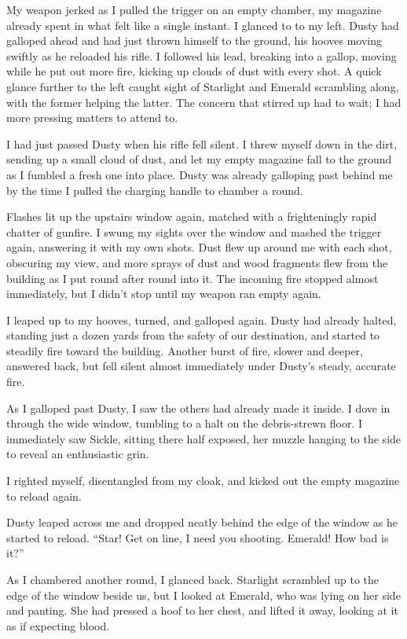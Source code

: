 My weapon jerked as I pulled the trigger on an empty chamber, my magazine already spent in what felt like a single instant. I glanced to to my left. Dusty had galloped ahead and had just thrown himself to the ground, his hooves moving swiftly as he reloaded his rifle. I followed his lead, breaking into a gallop, moving while he put out more fire, kicking up clouds of dust with every shot. A quick glance further to the left caught sight of Starlight and Emerald scrambling along, with the former helping the latter. The concern that stirred up had to wait; I had more pressing matters to attend to.

I had just passed Dusty when his rifle fell silent. I threw myself down in the dirt, sending up a small cloud of dust, and let my empty magazine fall to the ground as I fumbled a fresh one into place. Dusty was already galloping past behind me by the time I pulled the charging handle to chamber a round.

Flashes lit up the upstairs window again, matched with a frighteningly rapid chatter of gunfire. I swung my sights over the window and mashed the trigger again, answering it with my own shots. Dust flew up around me with each shot, obscuring my view, and more sprays of dust and wood fragments flew from the building as I put round after round into it. The incoming fire stopped almost immediately, but I didn’t stop until my weapon ran empty again.

I leaped up to my hooves, turned, and galloped again. Dusty had already halted, standing just a dozen yards from the safety of our destination, and started to steadily fire toward the building. Another burst of fire, slower and deeper, answered back, but fell silent almost immediately under Dusty’s steady, accurate fire.

As I galloped past Dusty, I saw the others had already made it inside. I dove in through the wide window, tumbling to a halt on the debris-strewn floor. I immediately saw Sickle, sitting there half exposed, her muzzle hanging to the side to reveal an enthusiastic grin.

I righted myself, disentangled from my cloak, and kicked out the empty magazine to reload again.

Dusty leaped across me and dropped neatly behind the edge of the window as he started to reload. “Star! Get on line, I need you shooting. Emerald! How bad is it?”

As I chambered another round, I glanced back. Starlight scrambled up to the edge of the window beside us, but I looked at Emerald, who was lying on her side and panting. She had pressed a hoof to her chest, and lifted it away, looking at it as if expecting blood.

